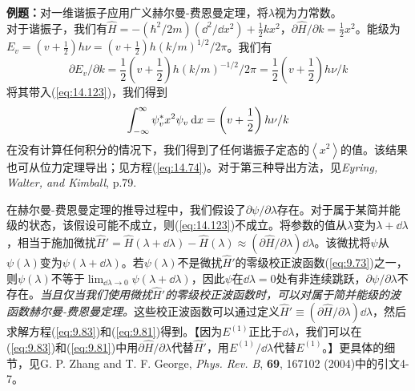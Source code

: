     \begin{examplebox}
        \textbf{例题：}对一维谐振子应用广义赫尔曼-费恩曼定理，将$\lambda$视为力常数。
        \\

        对于谐振子，我们有$\hat{H} = -\left(\hbar^2 / 2m\right)\left(\dd ^2 / \dd x^2\right) + \frac{1}{2} kx^2$，$\partial \hat{H} / \partial k = \frac{1}{2} x^2$。能级为$E_v = \left(v + \frac{1}{2}\right) h\nu = \left(v + \frac{1}{2}\right) h \left(k/m\right)^{1/2}/2\pi$。我们有
        \begin{equation*}
            \partial E_v / \partial k = \frac{1}{2} \left(v + \frac{1}{2}\right) h \left(k/m\right)^{-1/2} / 2\pi = \frac{1}{2} \left(v + \frac{1}{2}\right) h\nu / k
        \end{equation*}
        将其带入(\ref{eq:14.123})，我们得到
        \begin{equation}
            \int_{-\infty}^{\infty} \psi_v^*  x^2 \psi_v \:\dd x = \left(v + \frac{1}{2}\right) h\nu / k
            \label{eq:14.124}
        \end{equation}
        在没有计算任何积分的情况下，我们得到了任何谐振子定态的$\left\langle x^2 \right\rangle$的值。该结果也可从位力定理导出；见方程(\ref{eq:14.74})。对于第三种导出方法，见\textit{Eyring, Walter, and Kimball}, p.79.
    \end{examplebox}

    在赫尔曼-费恩曼定理的推导过程中，我们假设了$\partial \psi / \partial \lambda$存在。对于属于某简并能级的状态，该假设可能不成立，则(\ref{eq:14.123})不成立。将参数的值从$\lambda$变为$\lambda + \dd \lambda$，相当于施加微扰$\hat{H}' = \hat{H} \left(\lambda + \dd \lambda\right) - \hat{H} \left(\lambda\right) \approx \left(\partial \hat{H} / \partial \lambda\right) \dd \lambda$。该微扰将$\psi$从$\psi\left(\lambda\right)$变为$\psi\left(\lambda + \dd \lambda\right)$。若$\psi\left(\lambda\right)$不是微扰$\hat{H}'$的零级校正波函数(\ref{eq:9.73})之一，则$\psi\left(\lambda\right)$不等于$\lim_{\dd \lambda \to 0} \psi\left(\lambda + \dd \lambda\right)$，因此$\psi$在$\dd \lambda = 0$处有非连续跳跃，$\partial \psi / \partial \lambda$不存在。\textit{当且仅当我们使用微扰$\hat{H}'$的零级校正波函数时，可以对属于简并能级的波函数赫尔曼-费恩曼定理。}这些校正波函数可以通过定义$\hat{H}' \equiv \left(\partial \hat{H} / \partial \lambda\right) \dd \lambda$，然后求解方程(\ref{eq:9.83})和(\ref{eq:9.81})得到。【因为$E^{\left(1\right)}$正比于$\dd \lambda$，我们可以在(\ref{eq:9.83})和(\ref{eq:9.81})中用$\partial \hat{H} / \partial \lambda$代替$\hat{H}'$，用$E^{\left(1\right)} / \dd \lambda$代替$E^{\left(1\right)}$。】更具体的细节，见G. P. Zhang and T. F. George, \textit{Phys. Rev. B}, \textbf{69}, 167102 (2004)中的引文4-7。

